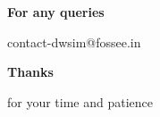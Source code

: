 \documentclass[10pt]{beamer}
\begin{document}
\begin{frame}
	\begin{center}
		\begin{Huge}
			\textbf{For any queries}
		\end{Huge}
	\end{center}
	\begin{center}
		\begin{Huge}
			contact-dwsim@fossee.in
		\end{Huge}
	\end{center}
\end{frame}


\begin{frame}
\begin{center}
\begin{Huge}
\textbf{Thanks}
\end{Huge}
\end{center}
\begin{center}
\begin{Huge}
for your time and patience
\end{Huge}
\end{center}
\end{frame}
\end{document}
